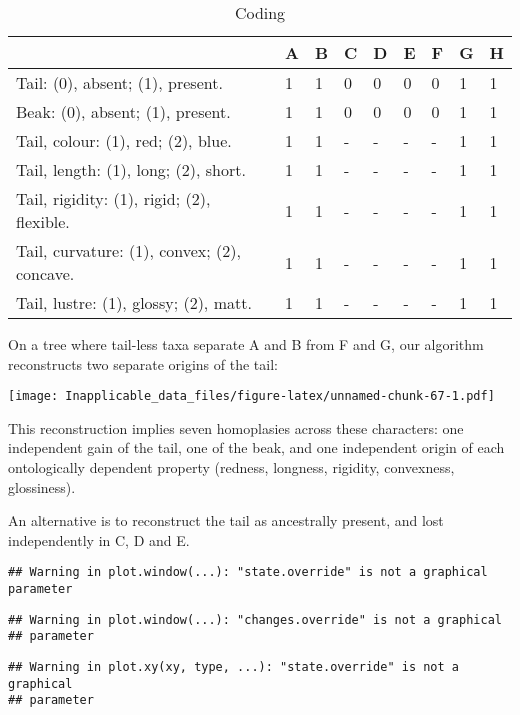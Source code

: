 \documentclass[]{book}
\theoremstyle{definition}
\theoremstyle{definition}
\theoremstyle{definition}
\theoremstyle{remark}
\begin{document}
\begin{table}

\caption{\label{tab:unnamed-chunk-66}Coding}
\centering
\begin{tabular}[t]{l|l|l|l|l|l|l|l|l}
\hline
  & A & B & C & D & E & F & G & H\\
\hline
Tail: (0), absent; (1), present. & 1 & 1 & 0 & 0 & 0 & 0 & 1 & 1\\
\hline
Beak: (0), absent; (1), present. & 1 & 1 & 0 & 0 & 0 & 0 & 1 & 1\\
\hline
Tail, colour: (1), red; (2), blue. & 1 & 1 & - & - & - & - & 1 & 1\\
\hline
Tail, length: (1), long; (2), short. & 1 & 1 & - & - & - & - & 1 & 1\\
\hline
Tail, rigidity: (1), rigid; (2), flexible. & 1 & 1 & - & - & - & - & 1 & 1\\
\hline
Tail, curvature: (1), convex; (2), concave. & 1 & 1 & - & - & - & - & 1 & 1\\
\hline
Tail, lustre: (1), glossy; (2), matt. & 1 & 1 & - & - & - & - & 1 & 1\\
\hline
\end{tabular}
\end{table}

On a tree where tail-less taxa separate A and B from F and G, our
algorithm reconstructs two separate origins of the tail:

\texttt{[image: Inapplicable\_data\_files/figure-latex/unnamed-chunk-67-1.pdf]}

This reconstruction implies seven homoplasies across these characters:
one independent gain of the tail, one of the beak, and one independent
origin of each ontologically dependent property (redness, longness,
rigidity, convexness, glossiness).

An alternative is to reconstruct the tail as ancestrally present, and
lost independently in C, D and E.

\begin{verbatim}
## Warning in plot.window(...): "state.override" is not a graphical parameter
\end{verbatim}

\begin{verbatim}
## Warning in plot.window(...): "changes.override" is not a graphical
## parameter
\end{verbatim}

\begin{verbatim}
## Warning in plot.xy(xy, type, ...): "state.override" is not a graphical
## parameter
\end{verbatim}
\end{document}
